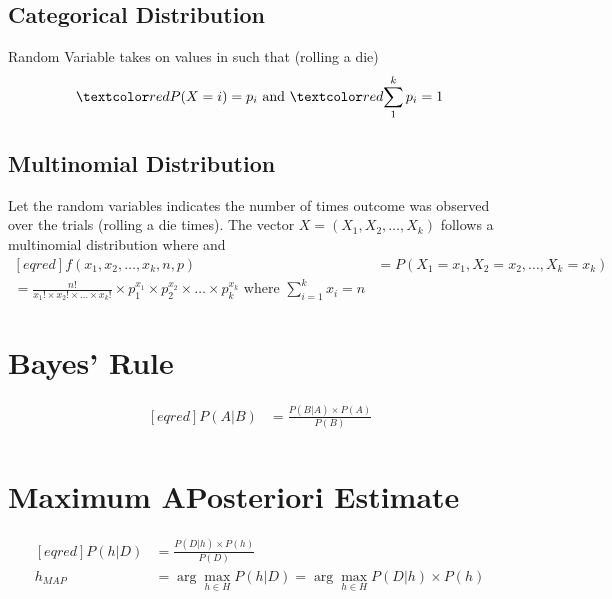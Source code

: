 \documentclass[
	exam={Midterm}
]{cs584exam}
\begin{document}
\subsection{Categorical Distribution}\label{subsec:categorical-distribution}
Random Variable  takes on values in  such that (rolling a die)
\[ \data{ P(X = i) = p_{i} } \mbox{ and } \data{ \sum_{1}^{k} p_{i} = 1 } \]

\subsection{Multinomial Distribution}\label{subsec:multinomial-distribution}
Let the random variables  indicates the number of times outcome  was observed over the  trials (rolling a die  times).
The vector $X=(X_{1}, X_{2}, \dots, X_{k})$ follows a multinomial distribution  where  and 
\begin{equation*}
\begin{aligned}[eqred]
	f(x_{1}, x_{2}, \dots, x_{k}, n, p) &= P(X_{1} = x_{1}, X_{2} = x_{2}, \dots, X_{k} = x_{k})\\
		= \frac{n!}{x_{1}! \times x_{2}! \times \dots \times x_{k}!} \times p_{1}^{x_{1}} \times p_{2}^{x_{2}} \times \dots \times p_{k}^{x_{k}} \mbox{ where } \sum_{i=1}^{k} x_{i} = n
\end{aligned}
\end{equation*}

\section{Bayes' Rule}\label{sec:bayes'-rule}
\begin{equation}
	\begin{aligned}[eqred]
		P(A|B) &= \frac{P(B|A)\times P(A)}{P(B)}\\
	\end{aligned}
	\label{eq:bayes-rule}
\end{equation}

\section{Maximum APosteriori Estimate}\label{sec:maximum-aposteriori-estimate}
\begin{equation}
	\begin{aligned}[eqred]
		P(h|D) &= \frac{P(D|h)\times P(h)}{P(D)}\\
		h_{MAP} &= \arg\max_{h\in H}P(h|D) = \arg\max_{h\in H}P(D|h)\times P(h)\\
	\end{aligned}
	\label{eq:map}
\end{equation}
\end{document}
